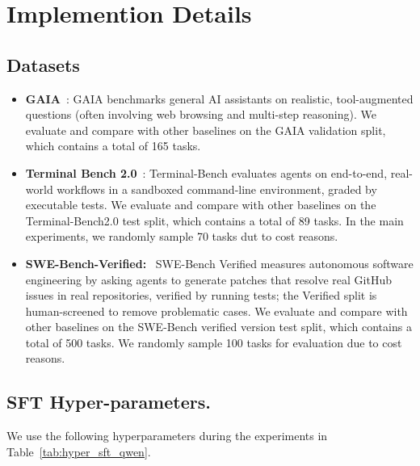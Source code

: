 
\clearpage
\onecolumn
\appendix
\label{sec:appendix}

\section{Implemention Details}
\label{app:A}

\subsection{Datasets}
\label{app:dataset}
\begin{itemize}
    \item \textbf{GAIA}~\cite{mialon2023gaia}: 
    GAIA benchmarks general AI assistants on realistic, tool-augmented questions (often involving web browsing and multi-step reasoning).
    We evaluate \our{} and compare with other baselines on the GAIA validation split, which contains a total of 165 tasks.

    \item \textbf{Terminal Bench 2.0}~\cite{tbench_2025}: Terminal-Bench evaluates agents on end-to-end, real-world workflows in a sandboxed command-line environment, graded by executable tests. 
    We evaluate \our{} and compare with other baselines on the Terminal-Bench2.0 test split, which contains a total of 89 tasks. In the main experiments, we randomly sample 70 tasks dut to cost reasons.

    \item \textbf{SWE-Bench-Verified:}~\cite{jimenez2023swe} 
    SWE-Bench Verified measures autonomous software engineering by asking agents to generate patches that resolve real GitHub issues in real repositories, verified by running tests; the Verified split is human-screened to remove problematic cases.
    We evaluate \our{} and compare with other baselines on the SWE-Bench verified version test split, which contains a total of 500 tasks. We randomly sample 100 tasks for evaluation due to cost reasons.
\end{itemize}

\subsection{SFT Hyper-parameters.}
\label{app:sft_hyper}
We use the following hyperparameters during the experiments in Table~\ref{tab:hyper_sft_qwen}.

